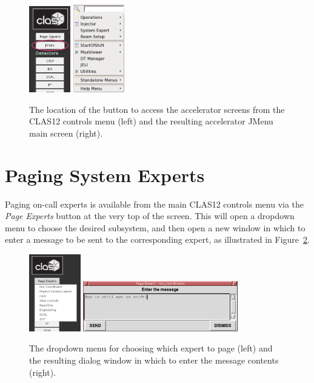 \documentclass[amsmath,amssymb,notitlepage,11pt]{revtex4}
\begin{document}
\begin{figure}[htbp]\centering
  \includegraphics[width=0.16\textwidth]{pics/clas12jmenu}
  \includegraphics[width=0.2\textwidth]{pics/jmenu}
  \caption{The location of the button to access the accelerator screens from the CLAS12 controls menu (left) and the resulting accelerator JMenu main screen (right).\label{fig:jmenu}}
\end{figure}

\section{Paging System Experts}\label{sec:pagingexperts}
Paging on-call experts is available from the main CLAS12 controls menu via the {\em Page Experts} button at the very top of the screen.  This will open a dropdown menu to choose the desired subsystem, and then open a new window in which to enter a message to be sent to the corresponding expert, as illustrated in Figure~\ref{fig:pageexpert}.
\begin{figure}[htbp]\centering
  \includegraphics[width=0.2\textwidth]{pics/pageexpert}
  \includegraphics[width=0.6\textwidth]{pics/pageexpertmsg}
  \caption{The dropdown menu for choosing which expert to page (left) and the resulting dialog window in which to enter the message contents (right).\label{fig:pageexpert}}
\end{figure}
\end{document}

